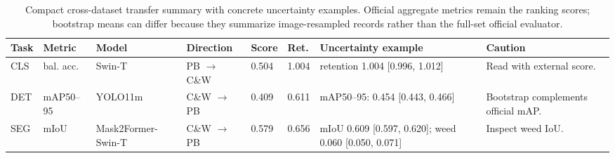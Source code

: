 \begin{table}[!htbp]
\centering
\scriptsize
\setlength{\tabcolsep}{3pt}
\renewcommand{\arraystretch}{1.20}
\caption{Compact cross-dataset transfer summary with concrete uncertainty examples. Official aggregate metrics remain the ranking scores; bootstrap means can differ because they summarize image-resampled records rather than the full-set official evaluator.}
\label{tab:transfer}
\begin{tabularx}{\textwidth}{@{}C{0.045\textwidth}C{0.078\textwidth}P{0.145\textwidth}C{0.100\textwidth}C{0.070\textwidth}C{0.070\textwidth}X P{0.135\textwidth}@{}}
\toprule
Task & Metric & Model & Direction & Score & Ret. & Uncertainty example & Caution \\
\midrule
CLS & bal. acc. & Swin-T & PB $\rightarrow$ C\&W & 0.504 & 1.004 & retention 1.004 [0.996, 1.012] & Read with external score. \\
DET & mAP50--95 & YOLO11m & C\&W $\rightarrow$ PB & 0.409 & 0.611 & mAP50--95: 0.454 [0.443, 0.466] & Bootstrap complements official mAP. \\
SEG & mIoU & Mask2Former-Swin-T & C\&W $\rightarrow$ PB & 0.579 & 0.656 & mIoU 0.609 [0.597, 0.620]; weed 0.060 [0.050, 0.071] & Inspect weed IoU. \\
\bottomrule
\end{tabularx}
\end{table}
